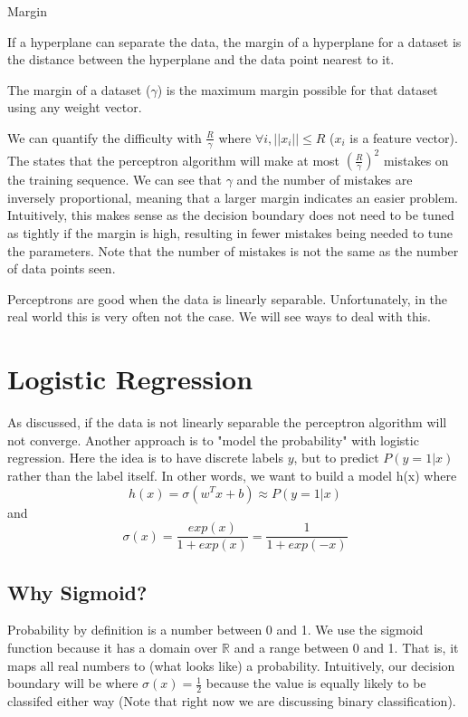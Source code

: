 \begin{definition}
    Margin

    If a hyperplane can separate the data, the margin of a hyperplane for a dataset is the distance between the hyperplane and the data point nearest to it.

    The margin of a dataset ($\gamma$) is the maximum margin possible for that dataset using any weight vector.

    We can quantify the difficulty with $\frac{R}{\gamma}$ where $\forall i,  ||x_i|| \le R $ ($x_i$ is a feature vector). The  states that the perceptron algorithm will make at most $(\frac{R}{\gamma})^2$ mistakes on the training sequence. We can see that $\gamma$ and the number of mistakes are inversely proportional, meaning that a larger margin indicates an easier problem. Intuitively, this makes sense as the decision boundary does not need to be tuned as tightly if the margin is high, resulting in fewer mistakes being needed to tune the parameters. Note that the number of mistakes is not the same as the number of data points seen. 

Perceptrons are good when the data is linearly separable. Unfortunately, in the real world this is very often not the case. We will see ways to deal with this.
\end{definition}

\section{Logistic Regression}
As discussed, if the data is not linearly separable the perceptron algorithm will not converge. Another approach is to "model the probability" with logistic regression. Here the idea is to have discrete labels $y$, but to predict $P(y = 1 | x)$ rather than the label itself. In other words, we want to build a model h(x) where
\[
    h(x) = \sigma(w^Tx + b) \approx P(y = 1 | x)
\]  
and 
\[
    \sigma(x) = \frac{exp(x)}{1 + exp(x)} = \frac{1}{1+exp(-x)}
\]

\subsection*{Why Sigmoid?}
Probability by definition is a number between 0 and 1. We use the sigmoid function because it has a domain over $\mathbb{R}$ and a range between 0 and 1. That is, it maps all real numbers to (what looks like) a probability. Intuitively, our decision boundary will be where $\sigma(x) = \frac{1}{2}$ because the value is equally likely to be classifed either way (Note that right now we are discussing binary classification).

